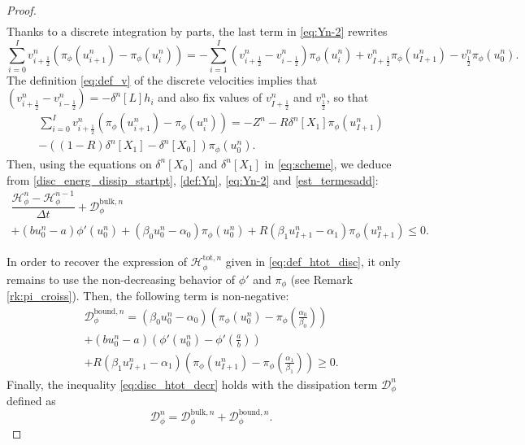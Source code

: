 \documentclass[10pt,a4paper]{amsart}
\newcommand\dt{\Delta t}
\renewcommand\H{\mathcal{H}_{\phi}}
\begin{document}
\begin{proof}
\begin{multline}
	\end{multline}
	Thanks to a discrete integration by parts, the last term in \eqref{eq:Yn-2} rewrites 
	$$
	\sum_{i=0}^I v_{i + \frac{1}{2}}^n (\pi_\phi(u_{i+1}^n) - \pi_\phi(u_{i}^n))=-\sum_{i=1}^I (v_{i + \frac{1}{2}}^n-v_{i - \frac{1}{2}}^n)\pi_\phi (u_{i}^n) + v_{I+\frac12}^n \pi_\phi(u_{I+1}^n) -v_{\frac{1}{2}}^n\pi_\phi(u_0^n).
	$$
	The definition \eqref{eq:def_v} of the discrete velocities implies that \((v_{i + \frac{1}{2}}^n-v_{i - \frac{1}{2}}^n)=-\delta^n[L]h_i\) and also fix values of  $v_{I+\frac{1}{2}}^n$ and $v_{\frac{1}{2}}^n$,
	so that 
	\begin{multline}\label{est_termesadd}
	\sum_{i=0}^I v_{i + \frac{1}{2}}^n (\pi_\phi(u_{i+1}^n) - \pi_\phi(u_{i}^n))=-Z^n-R\delta^n[X_1]\pi_\phi (u_{I+1}^n)\\
	-((1-R)\delta^n[X_1]-\delta^n[X_0])\pi_\phi(u_0^n).
	\end{multline}
		Then, using the equations on $\delta^n[X_0]$ and $\delta^n[X_1]$ in \eqref{eq:scheme}, we deduce from \eqref{disc_energ_dissip_startpt}, \eqref{def:Yn}, \eqref{eq:Yn-2} and \eqref{est_termesadd}:
		\begin{multline*}
			\dfrac{\H^n - \H^{n-1}}{\dt} + \mathcal{D}_{\phi}^{\text{bulk},n} \\
			+ (bu_0^n - a)\phi'(u_0^n)+ (\beta_0 u_0^n-\alpha_0 )\pi_\phi(u_0^n) 
			 + R( \beta_1 u_{I+1}^n-\alpha_1)\pi_\phi(u_{I+1}^n) \leq 0.
		\end{multline*}
		
		In order to recover the expression of $\H^{{\text{tot}},n}$ given in \eqref{eq:def_htot_disc}, it only remains to use the non-decreasing behavior of $\phi'$ and $\pi_\phi$ (see Remark \ref{rk:pi_croiss}). Then, the following term is non-negative:
		\begin{multline}\label{eq:dbound}
			\mathcal{D}^{\text{bound}, n}_\phi = (\beta_0 u_0^n-\alpha_0 )\left(\pi_\phi(u_0^n) - \pi_\phi\left(\frac{\alpha_0}{\beta_0}\right)\right) \\
			+ (bu_0^n-a)\left(\phi'(u_0^n) - \phi'\left(\frac{a}{b}\right)\right) \\
			+R(\beta_1 u_{I+1}^n-\alpha_1)\left(\pi_\phi(u_{I+1}^n) - \pi_\phi\left(\frac{\alpha_1}{\beta_1}\right)\right) \geq 0.
		\end{multline}
		Finally, the  inequality \eqref{eq:disc_htot_decr} holds
		with the dissipation term $\mathcal{D}_{\phi}^n$ defined as 
		\begin{equation} \label{eq:disc_diss_term}
			\mathcal{D}_{\phi}^n =  \mathcal{D}_{\phi}^{\text{bulk},n} + \mathcal{D}^{\text{bound}, n}_\phi.
		\end{equation}
	\end{proof}
\end{document}
